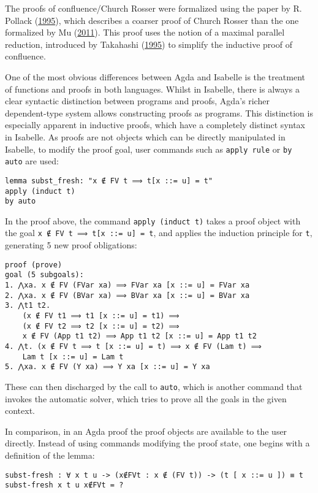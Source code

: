 \documentclass[a4paper, 12pt, twoside]{style/ociamthesis}
\theoremstyle{plain}
\theoremstyle{definition}
\theoremstyle{remark}
\begin{document}
The proofs of confluence/Church Rosser were formalized using the paper
by R. Pollack (\protect\hyperlink{ref-pollack95}{1995}), which describes
a coarser proof of Church Rosser than the one formalized by Mu
(\protect\hyperlink{ref-shing-cheng}{2011}). This proof uses the notion
of a maximal parallel reduction, introduced by Takahashi
(\protect\hyperlink{ref-takahashi95}{1995}) to simplify the inductive
proof of confluence.

One of the most obvious differences between Agda and Isabelle is the
treatment of functions and proofs in both languages. Whilst in Isabelle,
there is always a clear syntactic distinction between programs and
proofs, Agda's richer dependent-type system allows constructing proofs
as programs. This distinction is especially apparent in inductive
proofs, which have a completely distinct syntax in Isabelle. As proofs
are not objects which can be directly manipulated in Isabelle, to modify
the proof goal, user commands such as \texttt{apply rule} or
\texttt{by auto} are used:

\begin{verbatim}
lemma subst_fresh: "x ∉ FV t ⟹ t[x ::= u] = t"
apply (induct t)
by auto
\end{verbatim}

In the proof above, the command \texttt{apply (induct t)} takes a proof
object with the goal \texttt{x ∉ FV t ⟹ t[x ::= u] = t}, and applies the
induction principle for \texttt{t}, generating 5 new proof obligations:

\begin{verbatim}
proof (prove)
goal (5 subgoals):
1. ⋀xa. x ∉ FV (FVar xa) ⟹ FVar xa [x ::= u] = FVar xa
2. ⋀xa. x ∉ FV (BVar xa) ⟹ BVar xa [x ::= u] = BVar xa
3. ⋀t1 t2.
    (x ∉ FV t1 ⟹ t1 [x ::= u] = t1) ⟹
    (x ∉ FV t2 ⟹ t2 [x ::= u] = t2) ⟹
    x ∉ FV (App t1 t2) ⟹ App t1 t2 [x ::= u] = App t1 t2
4. ⋀t. (x ∉ FV t ⟹ t [x ::= u] = t) ⟹ x ∉ FV (Lam t) ⟹ 
    Lam t [x ::= u] = Lam t
5. ⋀xa. x ∉ FV (Y xa) ⟹ Y xa [x ::= u] = Y xa
\end{verbatim}

These can then discharged by the call to \texttt{auto}, which is another
command that invokes the automatic solver, which tries to prove all the
goals in the given context.

In comparison, in an Agda proof the proof objects are available to the
user directly. Instead of using commands modifying the proof state, one
begins with a definition of the lemma:

\begin{verbatim}
subst-fresh : ∀ x t u -> (x∉FVt : x ∉ (FV t)) -> (t [ x ::= u ]) ≡ t
subst-fresh x t u x∉FVt = ?
\end{verbatim}
\end{document}
